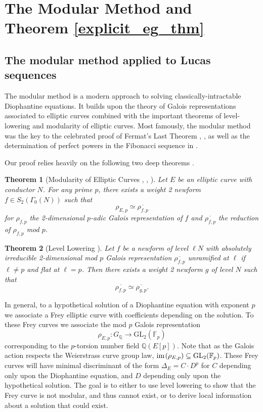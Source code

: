 \documentclass[12pt]{amsart}
\newtheorem{thm}{Theorem}[section]
\theoremstyle{definition}
\def\F{{\mathbb F}}
\def\Q{{\mathbb Q}}
\newcommand{\im}{\text{im} \hspace{0.1em} }
\newcommand{\GL}{\text{GL}}
\renewcommand{\bar}{\overline}
\begin{document}
\section{The Modular Method and Theorem \ref{explicit_eg_thm}}\label{mod_method}

\subsection{The modular method applied to Lucas sequences}

The modular method is a modern approach to solving classically-intractable Diophantine equations.  It builds upon the theory of Galois representations associated to elliptic curves combined with the important theorems of level-lowering and modularity of elliptic curves.  Most famously, the modular method was the key to the celebrated proof of Fermat's Last Theorem \cite{wiles95}, \cite{taylorwiles95}, as well as the determination of perfect powers in the Fibonacci sequence in \cite{siksek06}.

Our proof relies heavily on the following two deep theorems .

\begin{thm}[Modularity of Elliptic Curves \cite{wiles95}, \cite{taylorwiles95}, \cite{conrad01}]\label{modularity}
Let $E$ be an elliptic curve with conductor $N$.  For any prime $p$, there exists a weight 2 newform $f \in S_2(\Gamma_0(N))$ such that
\[ \rho_{E,p} \simeq \bar{\rho_{f,p}} \]
for $\rho_{f,p}$ the 2-dimensional $p$-adic Galois representation of $f$ and $\bar{\rho_{f,p}}$ the reduction of $\rho_{f,p}$ mod $p$.
\end{thm}

\begin{thm}[Level Lowering \cite{ribet91}]\label{levellow}
Let $f$ be a newform of level $\ell N$ with absolutely irreducible 2-dimensional mod $p$ Galois representation $\bar{\rho_{f,p}}$ unramified at $\ell$ if $\ell \neq p$ and flat at $\ell = p$.  Then there exists a weight 2 newform $g$ of level $N$ such that
\[ \bar{\rho_{f,p}} \simeq \bar{\rho_{g,p}}. \]
\end{thm}


In general, to a hypothetical solution of a Diophantine equation with exponent $p$ we associate a Frey elliptic curve with coefficients depending on the solution.  To these Frey curves we associate the mod $p$ Galois representation
\[ \rho_{E,p}: G_{\Q} \rightarrow \GL_2(\F_p) \]
corresponding to the $p$-torsion number field $\Q(E[p])$.  Note that as the Galois action respects the Weierstrass curve group law, $\im(\rho_{E,p}) \subseteq \GL_2(\F_p)$. These Frey curves will have minimal discriminant of the form $\Delta_E = C \cdot D^p$ for $C$ depending only upon the Diophantine equation, and $D$ depending only upon the hypothetical solution.  The goal is to either to use level lowering to show that the Frey curve is not modular, and thus cannot exist, or to derive local information about a solution that could exist. 
\end{document}

